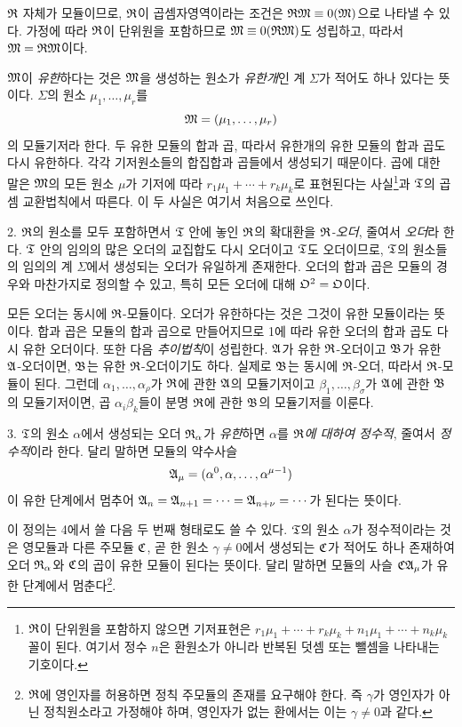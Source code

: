 \(\mathfrak{R}\) 자체가 모듈이므로, \(\mathfrak{R}\)이 곱셈자영역이라는 조건은 \(\mathfrak{R}\mathfrak M\equiv0(\mathfrak M)\)으로 나타낼 수 있다. 가정에 따라 \(\mathfrak{R}\)이 단위원을 포함하므로 \(\mathfrak M\equiv0(\mathfrak{R}\mathfrak M)\)도 성립하고, 따라서 \(\mathfrak M=\mathfrak{R}\mathfrak M\)이다.

\(\mathfrak M\)이 \emph{유한}하다는 것은 \(\mathfrak M\)을 생성하는 원소가 \emph{유한개}인 계 \(\Sigma\)가 적어도 하나 있다는 뜻이다. \(\Sigma\)의 원소 \(\mu_1,\ldots,\mu_r\)를
\[
        \mathfrak M=(\mu_1,\ldots,\mu_r)
\]
의 모듈기저라 한다. 두 유한 모듈의 합과 곱, 따라서 유한개의 유한 모듈의 합과 곱도 다시 유한하다. 각각 기저원소들의 합집합과 곱들에서 생성되기 때문이다. 곱에 대한 말은 \(\mathfrak M\)의 모든 원소 \(\mu\)가 기저에 따라 \(r_1\mu_1+\cdots+r_k\mu_k\)로 표현된다는 사실\footnote{\(\mathfrak{R}\)이 단위원을 포함하지 않으면 기저표현은 \(r_1\mu_1+\cdots+r_k\mu_k+n_1\mu_1+\cdots+n_k\mu_k\) 꼴이 된다. 여기서 정수 \(n\)은 환원소가 아니라 반복된 덧셈 또는 뺄셈을 나타내는 기호이다.}과 \(\mathfrak{T}\)의 곱셈 교환법칙에서 따른다. 이 두 사실은 여기서 처음으로 쓰인다.

2. \(\mathfrak{R}\)의 원소를 모두 포함하면서 \(\mathfrak{T}\) 안에 놓인 \(\mathfrak{R}\)의 확대환을 \emph{\(\mathfrak{R}\)-오더}, 줄여서 \emph{오더}라 한다. \(\mathfrak{T}\) 안의 임의의 많은 오더의 교집합도 다시 오더이고 \(\mathfrak{T}\)도 오더이므로, \(\mathfrak{T}\)의 원소들의 임의의 계 \(\Sigma\)에서 생성되는 오더가 유일하게 존재한다. 오더의 합과 곱은 모듈의 경우와 마찬가지로 정의할 수 있고, 특히 모든 오더에 대해 \(\mathfrak O^2=\mathfrak O\)이다.

모든 오더는 동시에 \(\mathfrak{R}\)-모듈이다. 오더가 유한하다는 것은 그것이 유한 모듈이라는 뜻이다. 합과 곱은 모듈의 합과 곱으로 만들어지므로 1에 따라 유한 오더의 합과 곱도 다시 유한 오더이다. 또한 다음 \emph{추이법칙}이 성립한다. \(\mathfrak A\)가 유한 \(\mathfrak{R}\)-오더이고 \(\mathfrak B\)가 유한 \(\mathfrak A\)-오더이면, \(\mathfrak B\)는 유한 \(\mathfrak{R}\)-오더이기도 하다. 실제로 \(\mathfrak B\)는 동시에 \(\mathfrak{R}\)-오더, 따라서 \(\mathfrak{R}\)-모듈이 된다. 그런데 \(\alpha_1,\ldots,\alpha_\rho\)가 \(\mathfrak{R}\)에 관한 \(\mathfrak A\)의 모듈기저이고 \(\beta_1,\ldots,\beta_\sigma\)가 \(\mathfrak A\)에 관한 \(\mathfrak B\)의 모듈기저이면, 곱 \(\alpha_i\beta_k\)들이 분명 \(\mathfrak{R}\)에 관한 \(\mathfrak B\)의 모듈기저를 이룬다.

3. \(\mathfrak{T}\)의 원소 \(\alpha\)에서 생성되는 오더 \(\mathfrak{R}_\alpha\)가 \emph{유한}하면 \(\alpha\)를 \emph{\(\mathfrak{R}\)에 대하여 정수적}, 줄여서 \emph{정수적}이라 한다. 달리 말하면 모듈의 약수사슬
\[
        \mathfrak A_\mu=(\alpha^0,\alpha,\ldots,\alpha^{\mu-1})
\]
이 유한 단계에서 멈추어 \(\mathfrak A_n=\mathfrak A_{n+1}=\cdots=\mathfrak A_{n+\nu}=\cdots\)가 된다는 뜻이다.

이 정의는 4에서 쓸 다음 두 번째 형태로도 쓸 수 있다. \(\mathfrak{T}\)의 원소 \(\alpha\)가 정수적이라는 것은 영모듈과 다른 주모듈 \(\mathfrak{C}\), 곧 한 원소 \(\gamma\ne0\)에서 생성되는 \(\mathfrak{C}\)가 적어도 하나 존재하여 오더 \(\mathfrak{R}_\alpha\)와 \(\mathfrak{C}\)의 곱이 유한 모듈이 된다는 뜻이다. 달리 말하면 모듈의 사슬 \(\mathfrak{C}\mathfrak A_\mu\)가 유한 단계에서 멈춘다\footnote{\(\mathfrak{R}\)에 영인자를 허용하면 정칙 주모듈의 존재를 요구해야 한다. 즉 \(\gamma\)가 영인자가 아닌 정칙원소라고 가정해야 하며, 영인자가 없는 환에서는 이는 \(\gamma\ne0\)과 같다.}.

